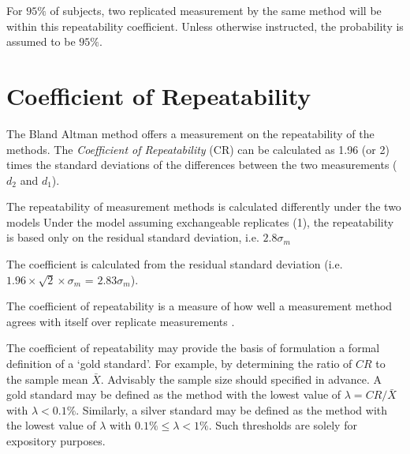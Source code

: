 \documentclass[12pt, a4paper]{report}
\theoremstyle{plain}
\theoremstyle{definition}
\theoremstyle{remark}
\begin{document}
For $95\%$ of subjects, two replicated measurement by the same method will be within this repeatability coefficient. Unless otherwise instructed, the probability is assumed to be $95\%$. 
	

	




	
\section{Coefficient of Repeatability}
The Bland Altman method offers a measurement on the repeatability of the methods. The \emph{Coefficient of Repeatability} (CR) can be calculated as 1.96 (or 2) times the standard deviations of the differences between the two measurements ($d_2$ and $d_1$).		


%		
		
		The repeatability of measurement methods is calculated
		differently under the two models  Under the model assuming
		exchangeable replicates (1), the repeatability is based only on
		the residual standard deviation, i.e. $2.8\sigma_m$
	
	
	 The coefficient is calculated from the residual standard deviation (i.e. $1.96 \times \sqrt{2} \times \sigma_m$ = $2.83 \sigma_m$).
	

	
	The coefficient of repeatability is a measure of how well a
	measurement method agrees with itself over replicate measurements
	\citep{BA99}. 
	

	
	
	The coefficient of repeatability may provide the basis of formulation a formal definition of a `gold standard'. For example, by determining the ratio of $CR$ to the sample mean $\bar{X}$. Advisably the sample size should specified in advance. A gold standard may be defined as the method with the lowest value of $\lambda = CR /\bar{X}$ with $\lambda < 0.1\%$. Similarly, a silver standard may be defined as the method with the lowest value of $\lambda $ with $0.1\% \leq \lambda < 1\%$. Such thresholds are solely for expository purposes.
	
\end{document}
